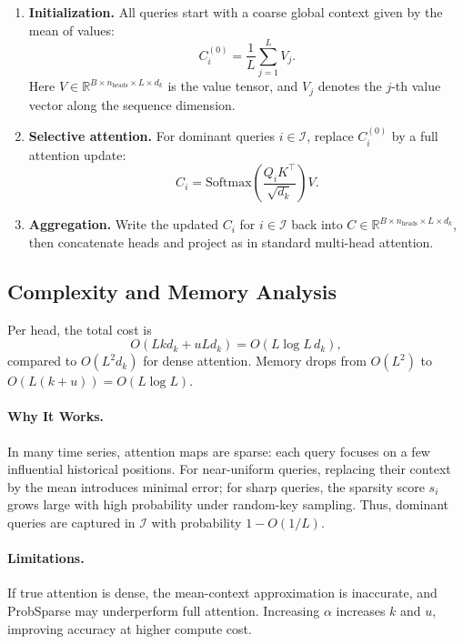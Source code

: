 \documentclass[11pt]{article}
\begin{document}
\begin{enumerate}[label=(\alph*)]
    \item \textbf{Initialization.}
    All queries start with a coarse global context given by the mean of values:
    \[
    C_i^{(0)} = \frac{1}{L}\sum_{j=1}^L V_j.
    \]
    Here $V \in \mathbb{R}^{B \times n_{\text{heads}} \times L \times d_k}$ is the value tensor,
    and $V_j$ denotes the $j$-th value vector along the sequence dimension.

    \item \textbf{Selective attention.}
    For dominant queries $i \in \mathcal{I}$, replace $C_i^{(0)}$ by a full attention update:
    \[
    C_i =
    \mathrm{Softmax}\!\left(
    \frac{Q_i K^\top}{\sqrt{d_k}}
    \right) V.
    \]

    \item \textbf{Aggregation.}
    Write the updated $C_i$ for $i \in \mathcal{I}$ back into $C \in \mathbb{R}^{B \times n_{\text{heads}} \times L \times d_k}$,
    then concatenate heads and project as in standard multi-head attention.
\end{enumerate}

\subsection{Complexity and Memory Analysis}

Per head, the total cost is
\[
O(L k d_k + u L d_k) = O(L \log L\, d_k),
\]
compared to $O(L^2 d_k)$ for dense attention.
Memory drops from $O(L^2)$ to $O(L(k + u)) = O(L \log L)$.

\paragraph{Why It Works.}
In many time series, attention maps are sparse: each query focuses on a few influential historical positions.
For near-uniform queries, replacing their context by the mean introduces minimal error;
for sharp queries, the sparsity score $s_i$ grows large with high probability under random-key sampling.
Thus, dominant queries are captured in $\mathcal{I}$ with probability $1 - O(1/L)$.

\paragraph{Limitations.}
If true attention is dense, the mean-context approximation is inaccurate, and ProbSparse may underperform full attention.
Increasing $\alpha$ increases $k$ and $u$, improving accuracy at higher compute cost.
\end{document}
